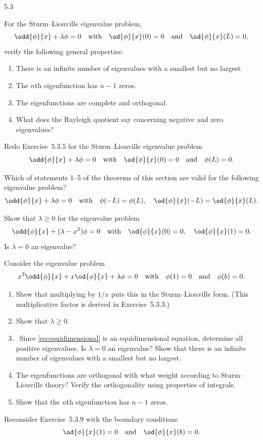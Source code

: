 \begin{exercises}{5.3}
\item For the Sturm--Liouville eigenvalue problem,
\[
\odd{\phi}{x} + \lambda\phi = 0 \quad \text{with} \quad \od{\phi}{x}(0) = 0 \quad \text{and} \quad \od{\phi}{x}(L) = 0,
\]
verify the following general properties:
\begin{enumerate}
\item There is an infinite number of eigenvalues with a smallest but no largest.
\item The $n$th eigenfunction has $n-1$ zeros.
\item The eigenfunctions are complete and orthogonal.
\item What does the Rayleigh quotient say concerning negative and zero eigenvalues?
\end{enumerate}

\item Redo Exercise~5.3.5 for the Sturm--Liouville eigenvalue problem
\[
\odd{\phi}{x} + \lambda\phi = 0 \quad \text{with} \quad \od{\phi}{x}(0) = 0 \quad \text{and} \quad \phi(L) = 0.
\]

\item Which of statements 1--5 of the theorems of this section are valid for the following eigenvalue problem?
\[
\odd{\phi}{x} + \lambda\phi = 0 \quad \text{with}\quad \phi(-L) = \phi(L), \quad \od{\phi}{x}(-L) = \od{\phi}{x}(L).
\]

\item Show that $\lambda \ge 0$ for the eigenvalue problem
\[
\odd{\phi}{x} + (\lambda - x^2)\phi = 0 \quad \text{with} \quad \od{\phi}{x}(0) = 0, \quad \od{\phi}{x}(1) = 0.
\]
Is $\lambda = 0$ an eigenvalue?

\item Consider the eigenvalue problem
\begin{equation}
\label{eq:equidimensional}
x^2\odd{\phi}{x} + x\od{\phi}{x} + \lambda\phi = 0 \quad \text{with} \quad \phi(1) = 0 \quad \text{and} \quad \phi(b) = 0.
\end{equation}
\begin{enumerate}
\item Show that multiplying by $1/x$ puts this in the Sturm--Liouville form.  (This multiplicative factor is derived in Exercise~5.3.3.)
\item Show that $\lambda \ge 0$.
\item\starred\ Since \eqref{eq:equidimensional} is an equidimensional equation, determine all positive eigenvalues.  Is $\lambda = 0$ an eigenvalue?  Show that there is an infinite number of eigenvalues with a smallest but no largest.
\item The eigenfunctions are orthogonal with what weight according to Sturm--Liouville theory?  Verify the orthogonality using properties of integrals.
\item Show that the $n$th eigenfunction has $n-1$ zeros.
\end{enumerate}

\item Reconsider Exercise~5.3.9 with the boundary conditions
\[
\od{\phi}{x}(1) = 0 \quad \text{and} \quad \od{\phi}{x}(b) = 0.
\]

\end{exercises}
